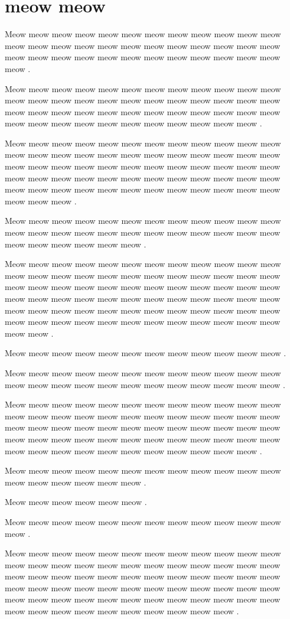 \documentclass[12pt, a5paper, openany]{book}
\begin{document}
\chapter{meow meow }Meow meow meow meow meow meow meow meow meow meow meow meow meow meow meow meow meow meow meow meow meow meow meow meow meow meow meow meow meow meow meow meow meow meow meow meow meow .

Meow meow meow meow meow meow meow meow meow meow meow meow meow meow meow meow meow meow meow meow meow meow meow meow meow meow meow meow meow meow meow meow meow meow meow meow meow meow meow meow meow meow meow meow meow meow meow .

Meow meow meow meow meow meow meow meow meow meow meow meow meow meow meow meow meow meow meow meow meow meow meow meow meow meow meow meow meow meow meow meow meow meow meow meow meow meow meow meow meow meow meow meow meow meow meow meow meow meow meow meow meow meow meow meow meow meow meow meow meow meow meow .

Meow meow meow meow meow meow meow meow meow meow meow meow meow meow meow meow meow meow meow meow meow meow meow meow meow meow meow meow meow meow .

Meow meow meow meow meow meow meow meow meow meow meow meow meow meow meow meow meow meow meow meow meow meow meow meow meow meow meow meow meow meow meow meow meow meow meow meow meow meow meow meow meow meow meow meow meow meow meow meow meow meow meow meow meow meow meow meow meow meow meow meow meow meow meow meow meow meow meow meow meow meow meow meow meow meow .

Meow meow meow meow meow meow meow meow meow meow meow meow .

Meow meow meow meow meow meow meow meow meow meow meow meow meow meow meow meow meow meow meow meow meow meow meow meow .

Meow meow meow meow meow meow meow meow meow meow meow meow meow meow meow meow meow meow meow meow meow meow meow meow meow meow meow meow meow meow meow meow meow meow meow meow meow meow meow meow meow meow meow meow meow meow meow meow meow meow meow meow meow meow meow meow meow meow meow .

Meow meow meow meow meow meow meow meow meow meow meow meow meow meow meow meow meow meow .

Meow meow meow meow meow meow .

Meow meow meow meow meow meow meow meow meow meow meow meow meow .

Meow meow meow meow meow meow meow meow meow meow meow meow meow meow meow meow meow meow meow meow meow meow meow meow meow meow meow meow meow meow meow meow meow meow meow meow meow meow meow meow meow meow meow meow meow meow meow meow meow meow meow meow meow meow meow meow meow meow meow meow meow meow meow meow meow meow meow meow meow meow .
\end{document}
